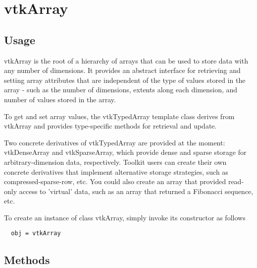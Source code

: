 \section{vtkArray}

\subsection{Usage}

 vtkArray is the root of a hierarchy of arrays that can be used to store data with
 any number of dimensions.  It provides an abstract interface for retrieving and
 setting array attributes that are independent of the type of values stored in the
 array - such as the number of dimensions, extents along each dimension, and number
 of values stored in the array.

 To get and set array values, the vtkTypedArray template class derives from vtkArray
 and provides type-specific methods for retrieval and update.

 Two concrete derivatives of vtkTypedArray are provided at the moment: vtkDenseArray
 and vtkSparseArray, which provide dense and sparse storage for arbitrary-dimension
 data, respectively.  Toolkit users can create their own concrete derivatives that
 implement alternative storage strategies, such as compressed-sparse-row, etc.  You
 could also create an array that provided read-only access to 'virtual' data, such
 as an array that returned a Fibonacci sequence, etc.


To create an instance of class vtkArray, simply
invoke its constructor as follows
\begin{verbatim}
  obj = vtkArray
\end{verbatim}
\subsection{Methods}

